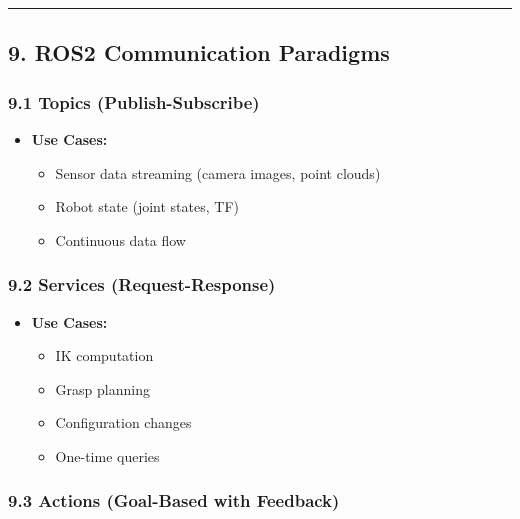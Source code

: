 \documentclass[
]{article}
\providecommand{\tightlist}{%
  \setlength{\itemsep}{0pt}\setlength{\parskip}{0pt}}
\begin{document}
\begin{center}\rule{0.5\linewidth}{0.5pt}\end{center}

\hypertarget{ros2-communication-paradigms}{%
\subsection{9. ROS2 Communication
Paradigms}\label{ros2-communication-paradigms}}

\hypertarget{topics-publish-subscribe}{%
\subsubsection{9.1 Topics
(Publish-Subscribe)}\label{topics-publish-subscribe}}

\begin{itemize}
\tightlist
\item
  \textbf{Use Cases:}

  \begin{itemize}
  \tightlist
  \item
    Sensor data streaming (camera images, point clouds)
  \item
    Robot state (joint states, TF)
  \item
    Continuous data flow
  \end{itemize}
\end{itemize}

\hypertarget{services-request-response}{%
\subsubsection{9.2 Services
(Request-Response)}\label{services-request-response}}

\begin{itemize}
\tightlist
\item
  \textbf{Use Cases:}

  \begin{itemize}
  \tightlist
  \item
    IK computation
  \item
    Grasp planning
  \item
    Configuration changes
  \item
    One-time queries
  \end{itemize}
\end{itemize}

\hypertarget{actions-goal-based-with-feedback}{%
\subsubsection{9.3 Actions (Goal-Based with
Feedback)}\label{actions-goal-based-with-feedback}}
\end{document}

